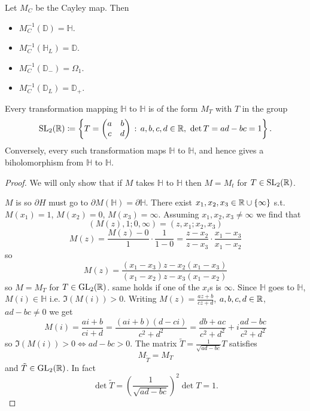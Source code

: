 \documentclass[10pt, a4paper]{article}
\begin{document}
\begin{corollary}
    Let $M_C$ be the Cayley map.
    Then
    \begin{itemize}
        \item $M_C ^ {-1}(\mathbb{D}) = \mathbb{H}$.

        \item $M_C ^ {-1}(\mathbb{H}_L) = \mathbb{D}$.

        \item $M_C ^ {-1}(\mathbb{D}_{-}) = \Omega_1$.
        
        \item $M_C ^ {-1}(\mathbb{D}_{L}) = \mathbb{D}_{+}$.
    \end{itemize}
\end{corollary}

\begin{proposition}[H$2$H]
    Every \mobius transformation mapping $\mathbb{H}$ to $\mathbb{H}$ is of the form $M_T$ with $T$ in the group
    \[
    \mathrm{SL}_2(\mathbb{R}) \coloneqq \left\{T = \begin{pmatrix}
        a & b \\ c & d
    \end{pmatrix}\,:\, a, b, c, d \in \mathbb{R},\ \det{T} = ad - bc = 1\right\}.
    \]
    Conversely,
    every such \mobius transformation maps $\mathbb{H}$ to $\mathbb{H}$,
    and hence gives a biholomorphism from $\mathbb{H}$ to $\mathbb{H}$.

    \begin{proof}
        We will only show that if $M$ takes $\mathbb{H}$ to $\mathbb{H}$ then $M = M_t$ for $T \in \mathrm{SL}_2(\mathbb{R})$.

        $M$ is \mobius so $\partial H$ must go to $\partial M(\mathbb{H}) = \partial \mathbb{H}$.
        There exist $x_1, x_2, x_3 \in \mathbb{R} \cup \{\infty\}$ s.t. $M(x_1) = 1$,
        $M(x_2) = 0$,
        $M(x_3) = \infty$.
        Assuming $x_1, x_2, x_3 \neq \infty$ we find that
        \[
        (M(z), 1; 0, \infty) = (z, x_1; x_2, x_3)
        \]
        \[
        M(z) = \frac{M(z) - 0}{1} \cdot \frac{1}{1 - 0} = \frac{z - x_2}{z - x_3}\cdot\frac{x_1 - x_3}{x_1 - x_2}
        \]
        so
        \[
        M(z) = \frac{(x_1 - x_3)z - x_2(x_1 - x_3)}{(x_1 - x_2)z - x_3(x_1 - x_2)}
        \]
        so $M = M_T$ for $T \in \mathrm{GL}_2(\mathbb{R})$.
        same holds if one of the $x_i$s is $\infty$.
        Since $\mathbb{H}$ goes to $\mathbb{H}$,
        $M(i) \in \mathbb{H}$ i.e. $\Im(M(i)) > 0$.
        Writing $M(z) = \frac{az + b}{cz + d}$,
        $a, b, c, d \in \mathbb{R}$,
        $ad - bc \neq 0$ we get
        \[
        M(i) = \frac{ai + b}{ci + d} = \frac{(ai + b)(d - ci)}{c ^ 2 + d ^ 2} = \frac{db + ac}{c ^ 2 + d ^ 2} + i\frac{ad - bc}{c ^ 2 + d ^ 2}
        \]
        so $\Im(M(i)) > 0 \iff ad - bc > 0$.
        The matrix $\tilde{T} = \frac{1}{\sqrt{ad - bc}}T$ satisfies
        \[
        M_{\tilde{T}} = M_T
        \]
        and $\tilde{T} \in \mathrm{GL}_2(\mathbb{R})$.
        In fact
        \[
        \det{\tilde{T}} = \left(\frac{1}{\sqrt{ad - bc}}\right) ^ 2\det{T} = 1.
        \]
    \end{proof}
\end{proposition}
\end{document}
